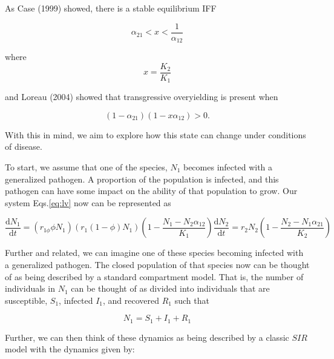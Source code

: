 \documentclass[
  letterpaper,
  DIV=11,
  numbers=noendperiod]{scrartcl}
\begin{document}
As Case (1999) showed, there is a stable equilibrium IFF

\begin{equation}\label{eq:coex}
\alpha_{21} < x < \frac{1}{\alpha_{12}}
\end{equation}

where \begin{equation}\label{eq:rel-carry}
x = \frac{K_2}{K_1}
\end{equation}

and Loreau (2004) showed that transgressive overyielding is present when

\begin{equation}\label{eq:orig-TO}
(1-\alpha_{21})(1-x\alpha_{12}) > 0.
\end{equation}

With this in mind, we aim to explore how this state can change under
conditions of disease.

To start, we assume that one of the species, \(N_1\) becomes infected
with a generalized pathogen. A proportion of the population is infected,
and this pathogen can have some impact on the ability of that population
to grow. Our system Eqs.\ref{eq:lv} now can be represented as

\begin{subequations}\label{eq:lv-prop}
\begin{equation}
\frac{\mathrm{d} N_1}{\mathrm{d}t} = (r_{1\phi} \phi N_1)(r_1 (1-\phi)N_1)\left( 1 - \frac{N_1 - N_2 \alpha_{1 2}}{K_1} \right) 
\end{equation}
\begin{equation}
\frac{\mathrm{d} N_2}{\mathrm{d}t} = r_2 N_2 \left( 1 - \frac{N_2 - N_1 \alpha_{2 1}}{K_2} \right)
\end{equation}
\end{subequations}

Further and related, we can imagine one of these species becoming
infected with a generalized pathogen. The closed population of that
species now can be thought of as being described by a standard
compartment model. That is, the number of individuals in \(N_1\) can be
thought of as divided into individuals that are susceptible, \(S_1\),
infected \(I_1\), and recovered \(R_1\) such that

\begin{equation} 
\label{eq:sum-sir}
  N_1 = S_1 + I_1 + R_1
\end{equation}

Further, we can then think of these dynamics as being described by a
classic \(SIR\) model with the dynamics given by:
\end{document}
